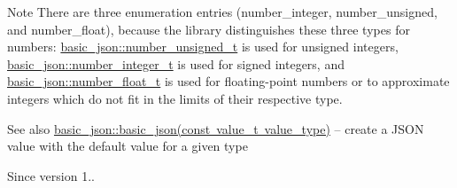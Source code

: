 \begin{DoxyNote}{Note}
There are three enumeration entries (number\+\_\+integer, number\+\_\+unsigned, and number\+\_\+float), because the library distinguishes these three types for numbers\+: \mbox{\hyperlink{classnlohmann_1_1basic__json_ab906e29b5d83ac162e823ada2156b989}{basic\+\_\+json\+::number\+\_\+unsigned\+\_\+t}} is used for unsigned integers, \mbox{\hyperlink{classnlohmann_1_1basic__json_a98e611d67b7bd75307de99c9358ab2dc}{basic\+\_\+json\+::number\+\_\+integer\+\_\+t}} is used for signed integers, and \mbox{\hyperlink{classnlohmann_1_1basic__json_a88d6103cb3620410b35200ee8e313d97}{basic\+\_\+json\+::number\+\_\+float\+\_\+t}} is used for floating-\/point numbers or to approximate integers which do not fit in the limits of their respective type.
\end{DoxyNote}
\begin{DoxySeeAlso}{See also}
\mbox{\hyperlink{classnlohmann_1_1basic__json_a32124a16dc80729d964d9caf607c2bc8}{basic\+\_\+json\+::basic\+\_\+json(const value\+\_\+t value\+\_\+type)}} -- create a J\+S\+ON value with the default value for a given type
\end{DoxySeeAlso}
\begin{DoxySince}{Since}
version 1.. 
\end{DoxySince}
